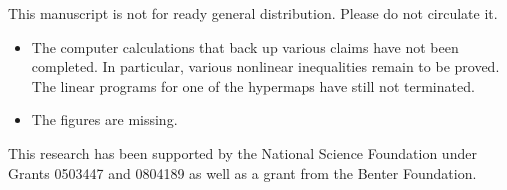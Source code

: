 \noindent



\bigskip




\begin{note}%
This manuscript is not for ready general distribution.  Please do not circulate it.
\begin{itemize}
\item The computer calculations that back up various claims have not
  been completed.  In particular, various nonlinear inequalities
  remain to be proved.  The linear programs for one of the hypermaps
  have still not terminated.
\item The figures are missing.
\end{itemize}
\end{note}

\bigskip\noindent %
This research has been supported by the National Science Foundation
under Grants 0503447 and 0804189 as well as a grant from the Benter
Foundation.

\bigskip\noindent\svninfo 

\newpage

